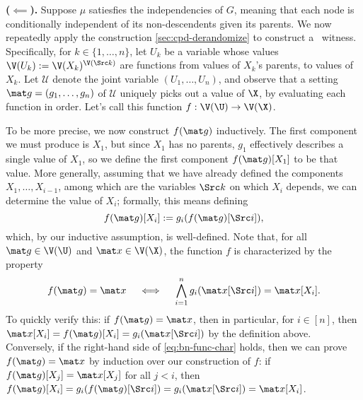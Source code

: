 \begin{subappendices}
\begin{lproof}
    \textbf{($\impliedby$).}
    Suppose $\mu$ satiesfies the independencies of $G$, meaning that each node is conditionally independent of its non-descendents given its parents.
    We now repeatedly apply the construction \cref{sec:cpd-derandomize} to construct a \scibility\ witness. 
    Specifically, for $k \in \{1, \ldots, n\}$, 
    let $U_k$ be a variable whose values $\V(U_k) := \V(X_k)^{\V(\Src k)}$ are functions from values of $X_k$'s parents, to values of $X_k$.
    Let $\mathcal U$ denote the joint variable $(U_1, \ldots, U_n)$,
    and observe that a setting $\mat g = (g_1, \ldots, g_n)$ of $\mathcal U$ uniquely picks out a value of $\X$, by evaluating each function in order. 
    Let's call this function $f : \V(\U) \to \V(\X)$. 
        
    To be more precise, we now construct $f(\mat g)$ inductively. 
    The first component we must produce is $X_1$, but since $X_1$ has no parents, $g_1$ effectively describes a single value of $X_1$, so we define the first component $f(\mat g)[X_1]$ to be that value.
    More generally, assuming that we have already defined the components $X_1, \ldots, X_{i-1}$, among which are the variables $\Src k$ on which $X_i$ depends, we can determine the value of $X_i$;
    formally, this means defining
    \[
        f(\mat g)[X_i] :=
            g_i( f(\mat g)[\Src i] ),
    \]
    which, by our inductive assumption, is well-defined.
    Note that, for all $\mat g \in \V(\U)$ and $\mat x \in \V(\X)$, the function $f$ is characterized by the property 
    \begin{equation}
            \label{eq:bn-func-char}
        f(\mat g) = \mat x
        \quad\iff\quad
        \bigwedge_{i=1}^n g_i(\mat x[\Src i]) = \mat x[X_i]. 
    \end{equation}
    To quickly verify this: if $f(\mat g) = \mat x$, then in particular, for $i \in [n]$, then $\mat x[X_i] = f(\mat g)[X_i] = g_i( \mat x[\Src i])$ by the definition above.
    Conversely, if the right-hand side of \eqref{eq:bn-func-char} holds, then we can prove $f(\mat g) = \mat x$ by induction over our construction of $f$: if $f(\mat g)[X_{j}] = \mat x[X_j]$ for all $j < i$, then $f(\mat g)[X_i] = g_i( f(\mat g) [\Src i]) = g_i(\mat x[\Src i]) = \mat x[X_i]$.
    

\end{lproof}
\end{subappendices}

